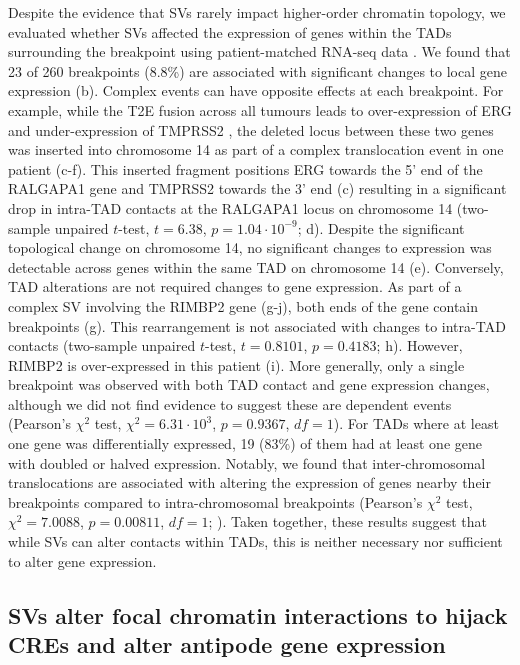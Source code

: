 Despite the evidence that SVs rarely impact higher-order chromatin topology, we evaluated whether SVs affected the expression of genes within the TADs surrounding the breakpoint using patient-matched RNA-seq data \cite{chenWidespreadFunctionalRNA2019}.
We found that 23 of 260 breakpoints (8.8\%) are associated with significant changes to local gene expression (b).
Complex events can have opposite effects at each breakpoint.
For example, while the T2E fusion across all tumours leads to over-expression of ERG and under-expression of TMPRSS2 \cite{fraserGenomicHallmarksLocalized2017,kronTMPRSS2ERGFusion2017}, the deleted locus between these two genes was inserted into chromosome 14 as part of a complex translocation event in one patient (c-f).
This inserted fragment positions ERG towards the 5' end of the RALGAPA1 gene and TMPRSS2 towards the 3' end (c) resulting in a significant drop in intra-TAD contacts at the RALGAPA1 locus on chromosome 14 (two-sample unpaired $t$-test, $t = 6.38$, $p = 1.04 \cdot 10^{-9}$; d).
Despite the significant topological change on chromosome 14, no significant changes to expression was detectable across genes within the same TAD on chromosome 14 (e).
Conversely, TAD alterations are not required changes to gene expression.
As part of a complex SV involving the RIMBP2 gene (g-j), both ends of the gene contain breakpoints (g).
This rearrangement is not associated with changes to intra-TAD contacts (two-sample unpaired $t$-test, $t = 0.8101$, $p = 0.4183$; h).
However, RIMBP2 is over-expressed in this patient (i).
More generally, only a single breakpoint was observed with both TAD contact and gene expression changes, although we did not find evidence to suggest these are dependent events (Pearson's $\chi^2$ test, $\chi^2 = 6.31 \cdot 10^3$, $p = 0.9367$, $df = 1$).
For TADs where at least one gene was differentially expressed, 19 (83\%) of them had at least one gene with doubled or halved expression.
Notably, we found that inter-chromosomal translocations are associated with altering the expression of genes nearby their breakpoints compared to intra-chromosomal breakpoints (Pearson's $\chi^2$ test, $\chi^2 = 7.0088$, $p = 0.00811$, $df = 1$; ).
Taken together, these results suggest that while SVs can alter contacts within TADs, this is neither necessary nor sufficient to alter gene expression.

\subsection{SVs alter focal chromatin interactions to hijack CREs and alter antipode gene expression}

